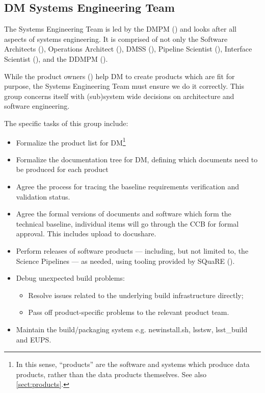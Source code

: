 \subsection{DM Systems Engineering Team \label{sect:sysengt}}

The Systems Engineering Team is led by the DMPM () and looks after all aspects of systems engineering.
It is comprised of not only the  Software Architects (), Operations Architect (), \gls{DMSS} (), Pipeline Scientist (), Interface Scientist (), and the \gls{DDMPM} ().

While the product owners () help DM to create products which are fit for purpose, the Systems Engineering Team must ensure we do it correctly. This group concerns itself with (sub)system wide decisions on architecture and software engineering.

The specific tasks of this group include:

\begin{itemize}
\item Formalize the product list for DM\footnote{In this sense, ``products'' are the software and systems which produce data products, rather than the data products themselves. See also \ref{sect:products}.}
\item Formalize the documentation tree for DM, defining which documents need to be produced for each product
\item Agree the process for tracing the baseline requirements verification and validation status.
\item Agree the formal versions of documents and software which form the technical baseline, individual items will go through the CCB for formal approval.  This includes upload to docushare.
\item Perform releases of software products --- including, but not limited to, the Science Pipelines --- as needed, using tooling provided by SQuaRE ().
\item Debug unexpected build problems:
\begin{itemize}
  \item{Resolve issues related to the underlying build infrastructure directly;}
  \item{Pass off product-specific problems to the relevant product team.}
\end{itemize}
\item Maintain the build/packaging system e.g.  newinstall.sh, lsstsw, lsst\_build and EUPS.
\end{itemize}

